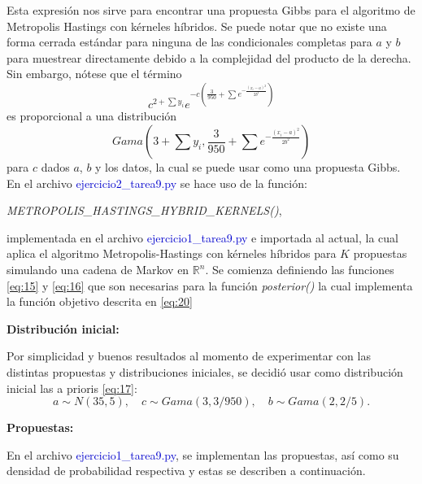 Esta expresión nos sirve para encontrar una propuesta Gibbs para el algoritmo de Metropolis Hastings con kérneles híbridos. Se puede notar que no existe una forma cerrada estándar para ninguna de las condicionales completas para $a$ y $b$ para muestrear directamente debido a la complejidad del producto de la derecha. Sin embargo, nótese que el término
\begin{equation} \label{eq:21}
	c^{2 + \sum y_i} e^{-c \left(\frac{3}{950} + \sum e^{- \frac{(x_i -a)^2}{2b^2}}\right)}
\end{equation}
es proporcional a una distribución
\begin{equation} \label{eq:22}
	Gama\left(3+\sum y_i, \frac{3}{950} + \sum e^{- \frac{(x_i -a)^2}{2b^2}}\right)
\end{equation}
para $c$ dados $a$, $b$ y los datos, la cual se puede usar como una propuesta Gibbs. En el archivo \textcolor{mediumblue}{ejercicio2\_tarea9.py} se hace uso de la función:
\begin{center}
	\textit{METROPOLIS\_HASTINGS\_HYBRID\_KERNELS()},
\end{center}
implementada en el archivo \textcolor{mediumblue}{ejercicio1\_tarea9.py} e importada al actual, la cual aplica el algoritmo Metropolis-Hastings con kérneles híbridos para $K$ propuestas simulando una cadena de Markov en $\mathbb{R}^n$. Se comienza definiendo las funciones \eqref{eq:15} y \eqref{eq:16} que son necesarias para la función \textit{posterior()} la cual implementa la función objetivo descrita en \eqref{eq:20}

\textbf{Distribución inicial:}

Por simplicidad y  buenos resultados al momento de experimentar con las distintas propuestas y distribuciones iniciales, se decidió usar como distribución inicial las a prioris \eqref{eq:17}:
\begin{equation} \label{eq:23}
		a \sim N(35,5), \quad c \sim Gama (3,3 / 950), \quad b \sim Gama (2,2 / 5).
\end{equation}

\textbf{Propuestas:}

En el archivo \textcolor{mediumblue}{ejercicio1\_tarea9.py}, se implementan las propuestas, así como su densidad de probabilidad respectiva y estas se describen a continuación.


